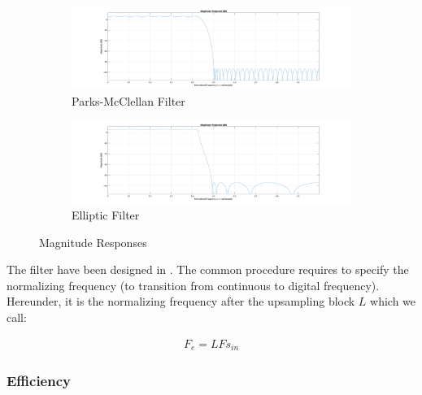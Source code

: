 \begin{figure}[ht]
	\begin{subfigure}[b]{0.5\textwidth}
		\includegraphics[height = 0.5\textwidth, width = 1.2\textwidth]{PM_direct.pdf}
		\caption{Parks-McClellan Filter}
		\label{mgpm}
	\end{subfigure}
	\hfill
	\begin{subfigure}[b]{0.5\textwidth}
		\includegraphics[height = 0.5\textwidth, width = 1.2\textwidth]{ellip_direct.pdf}
		\caption{Elliptic Filter}
		\label{mgellip}
	\end{subfigure}
	\caption{Magnitude Responses}\label{Figure 3.6}
\end{figure}

The filter have been designed in \MATLAB. The common procedure \cite{matlab} requires to specify the normalizing frequency (to transition from continuous to digital frequency). Hereunder, it is the normalizing frequency after the upsampling block $L$ which we call:

\begin{align}
	F_e = LFs_{in} \label{eqn:Fmax}
\end{align}
 
\subsubsection{Efficiency}

